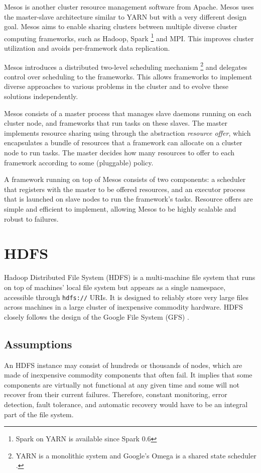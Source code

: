 \documentclass[11pt]{book}
\begin{document}
Mesos \cite{Hindman:2011:MPF} is another cluster resource management software from Apache. Mesos uses the master-slave architecture similar to YARN but with a very different design goal. Mesos aims to enable sharing clusters between multiple diverse cluster computing frameworks, such as Hadoop, Spark \footnote{Spark on YARN is available since Spark 0.6} and MPI. This improves cluster utilization and avoids per-framework data replication.

Mesos introduces a distributed two-level scheduling mechanism \footnote{YARN is a monolithic system and Google's Omega is a shared state scheduler \cite{Schwarzkopf:2013:OFS}.} and delegates control over scheduling to the frameworks. This allows frameworks to implement diverse approaches to various problems in the cluster and to evolve these solutions independently.

Mesos consists of a master process that manages slave daemons running on each cluster node, and frameworks that run tasks on these slaves.
The master implements resource sharing using through the abstraction {\em resource offer}, which encapsulates a bundle of resources that a framework can allocate on a cluster node to run tasks. The master decides how many resources to offer to each framework according to some (pluggable) policy.

A framework running on top of Mesos consists of two components: a scheduler that registers with the master to be offered resources, and an executor process that is launched on slave nodes to run the framework's tasks.
Resource offers are simple and efficient to implement, allowing Mesos to be highly scalable and robust to failures.

\section[HDFS]
{HDFS}
Hadoop Distributed File System (HDFS) \cite{HDFS} is a multi-machine file system that runs on top of machines' local file system but appears as a single namespace, accessible through \texttt{hdfs://} URIs. It is designed to reliably store very large files across machines in a large cluster of inexpensive commodity hardware. HDFS closely follows the design of the Google File System (GFS) \cite{Ghemawat:2003:GFS, McKusick:2009:GEF}.

\subsection{Assumptions}
An HDFS instance may consist of hundreds or thousands of nodes, which are made of inexpensive commodity components that often fail. It implies that some components are virtually not functional at any given time and some will not recover from their current failures. Therefore, constant monitoring, error detection, fault tolerance, and automatic recovery would have to be an integral part of the file system.
\end{document}
